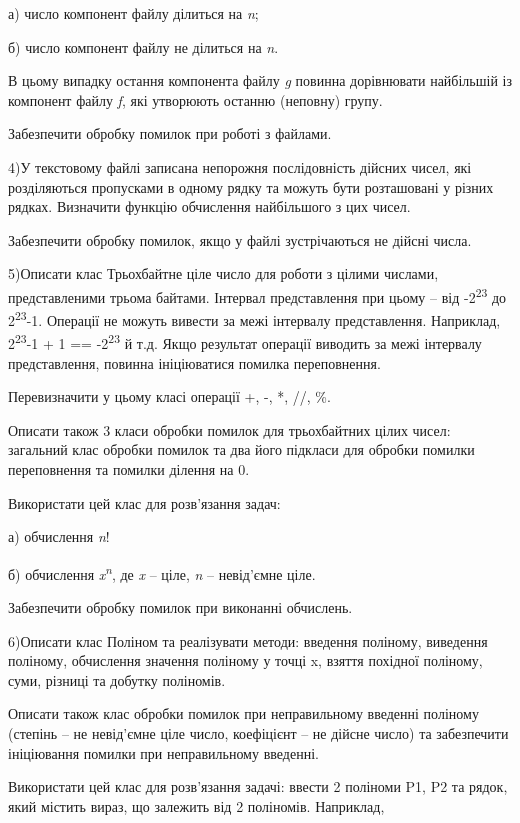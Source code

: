 \documentclass[]{article}
\begin{document}
а) число компонент файлу ділиться на \emph{n};

б) число компонент файлу не ділиться на \emph{n}.

В цьому випадку остання компонента файлу \emph{g} повинна дорівнювати
найбільшій із компонент файлу \emph{f}, які утворюють останню (неповну)
групу.

Забезпечити обробку помилок при роботі з файлами.

4)У текстовому файлі записана непорожня послідовність дійсних чисел, які
розділяються пропусками в одному рядку та можуть бути розташовані у
різних рядках. Визначити функцію обчислення найбільшого з цих чисел.

Забезпечити обробку помилок, якщо у файлі зустрічаються не дійсні числа.

5)Описати клас Трьохбайтне ціле число для роботи з цілими числами,
представленими трьома байтами. Інтервал представлення при цьому -- від
-2\textsuperscript{23} до 2\textsuperscript{23}-1. Операції не можуть
вивести за межі інтервалу представлення. Наприклад,
2\textsuperscript{23}-1 + 1 == -2\textsuperscript{23} й т.д. Якщо
результат операції виводить за межі інтервалу представлення, повинна
ініціюватися помилка переповнення.

Перевизначити у цьому класі операції +, -, *, //, \%.

Описати також 3 класи обробки помилок для трьохбайтних цілих чисел:
загальний клас обробки помилок та два його підкласи для обробки помилки
переповнення та помилки ділення на 0.

Використати цей клас для розв'язання задач:

а) обчислення \emph{n}!

б) обчислення \emph{x\textsuperscript{n}}, де \emph{x} -- ціле, \emph{n}
-- невід'ємне ціле.

Забезпечити обробку помилок при виконанні обчислень.

6)Описати клас Поліном та реалізувати методи: введення поліному,
виведення поліному, обчислення значення поліному у точці x, взяття
похідної поліному, суми, різниці та добутку поліномів.

Описати також клас обробки помилок при неправильному введенні поліному
(степінь -- не невід'ємне ціле число, коефіцієнт -- не дійсне число) та
забезпечити ініціювання помилки при неправильному введенні.

Використати цей клас для розв'язання задачі: ввести 2 поліноми P1, P2 та
рядок, який містить вираз, що залежить від 2 поліномів. Наприклад,
\end{document}
